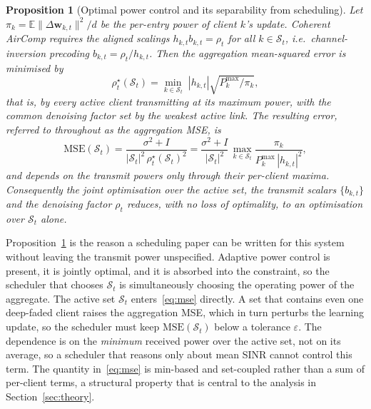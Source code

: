 \documentclass[lettersize,journal]{IEEEtran}
\newtheorem{proposition}{Proposition}
\newcommand{\bw}{\bm{w}}
\newcommand{\calS}{\mathcal{S}}
\begin{document}
\begin{proposition}[Optimal power control and its separability from scheduling]\label{prop:power}
Let $\pi_{k}=\mathbb{E}\lVert\Delta\bw_{k,t}\rVert^{2}/d$ be the per-entry power of client $k$'s update. Coherent AirComp requires the aligned scalings $h_{k,t}b_{k,t}=\rho_{t}$ for all $k\in\calS_t$, i.e.\ channel-inversion precoding $b_{k,t}=\rho_{t}/h_{k,t}$. Then the aggregation mean-squared error is minimised by
\begin{equation}
\rho^{\star}_{t}(\calS_t)=\min_{k\in\calS_t}\;|h_{k,t}|\sqrt{P^{\max}_{k}/\pi_{k}},
\label{eq:rhostar}
\end{equation}
that is, by every active client transmitting at its maximum power, with the common denoising factor set by the weakest active link. The resulting error, referred to throughout as the \emph{aggregation MSE}, is
\begin{equation}
\mathrm{MSE}(\calS_t)=\frac{\sigma^{2}+I}{|\calS_t|^{2}\,\rho^{\star}_{t}(\calS_t)^{2}}
=\frac{\sigma^{2}+I}{|\calS_t|^{2}}\,\max_{k\in\calS_t}\frac{\pi_{k}}{P^{\max}_{k}\,|h_{k,t}|^{2}},
\label{eq:mse}
\end{equation}
and depends on the transmit powers only through their per-client maxima. Consequently the joint optimisation over the active set, the transmit scalars $\{b_{k,t}\}$ and the denoising factor $\rho_{t}$ reduces, with no loss of optimality, to an optimisation over $\calS_t$ alone.
\end{proposition}

Proposition~\ref{prop:power} is the reason a scheduling paper can be written for this system without leaving the transmit power unspecified. Adaptive power control is present, it is jointly optimal, and it is absorbed into the constraint, so the scheduler that chooses $\calS_t$ is simultaneously choosing the operating power of the aggregate. The active set $\calS_t$ enters~\eqref{eq:mse} directly. A set that contains even one deep-faded client raises the aggregation MSE, which in turn perturbs the learning update, so the scheduler must keep $\mathrm{MSE}(\calS_t)$ below a tolerance $\varepsilon$. The dependence is on the \emph{minimum} received power over the active set, not on its average, so a scheduler that reasons only about mean SINR cannot control this term. The quantity in~\eqref{eq:mse} is min-based and set-coupled rather than a sum of per-client terms, a structural property that is central to the analysis in Section~\ref{sec:theory}.
\end{document}
